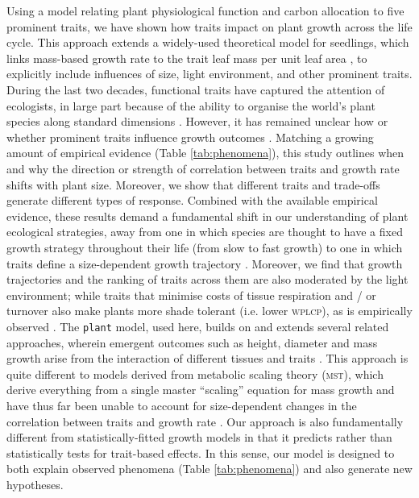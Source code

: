 \documentclass[9pt,twocolumn,twoside,lineno]{pnas-new}
\newcommand{\plant}{\texttt{plant}}
\begin{document}
Using a model relating plant physiological function and carbon allocation to five prominent traits, we have shown how traits impact on plant growth across the life cycle. This approach extends a widely-used theoretical model for seedlings, which links mass-based growth rate to the trait leaf mass per unit leaf area \citep{Lambers-1992, Wright-2000}, to explicitly include influences of size, light environment, and other prominent traits. During the last two decades, functional traits have captured the attention of ecologists, in large part because of the ability to organise the world's plant species along standard dimensions \citep{Westoby-2002}. However, it has remained unclear how or whether prominent traits influence growth outcomes \citep{Poorter-2008, Wright-2010,Paine-2015}. Matching a growing amount of empirical evidence (Table \ref{tab:phenomena}), this study outlines when and why the direction or strength of correlation between traits and growth rate shifts with plant size. Moreover, we show that different traits and trade-offs generate different types of response. Combined with the available empirical evidence, these results demand a fundamental shift in our understanding of plant ecological strategies, away from one in which species are thought to have a fixed growth strategy throughout their life (from slow to fast growth) \citep[e.g.][]{Grime-1977, Adler-2014, Paine-2015} to one in which traits define a size-dependent growth trajectory \citep{Gibert-2016}. Moreover, we find that growth trajectories and the ranking of traits across them are also moderated by the light environment; while traits that minimise costs of tissue respiration and / or turnover also make plants more shade tolerant (i.e. lower \textsc{wplcp}), as is empirically observed \citep{Messier-1999, Craine-2005, Poorter-2006, Baltzer-2007, Lusk-2008}. The {\plant} model, used here, builds on and extends several related approaches, wherein emergent outcomes such as height, diameter and mass growth arise from the interaction of different tissues and traits \citep[e.g.][]{Givnish-1988, Makela-1997, Moorcroft-2001}. This approach is quite different to models derived from metabolic scaling theory (\textsc{mst}), which derive everything from a single master ``scaling'' equation for mass growth and have thus far been unable to account for size-dependent changes in the correlation between traits and growth rate \citep{Enquist-1999, Enquist-2007}. Our approach is also fundamentally different from statistically-fitted growth models \citep[e.g.][]{Herault-2011, Ruger-2012, Iida-2014} in that it predicts rather than statistically tests for trait-based effects. In this sense, our model is designed to both explain observed phenomena (Table \ref{tab:phenomena}) and also generate new hypotheses.
\end{document}
